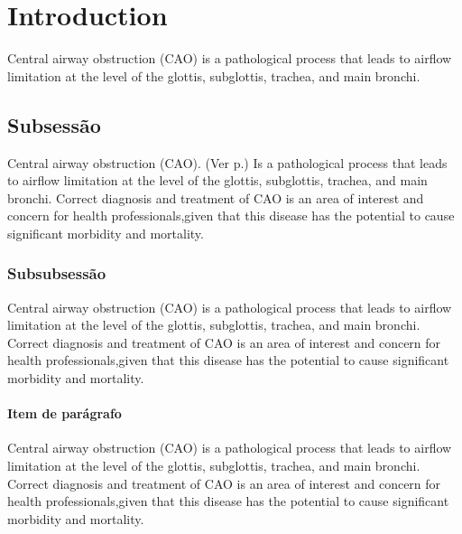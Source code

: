 \documentclass[10pt,a4paper]{article}
\begin{document}
\printtitle 
\printauthor


      \renewcommand{\sectype}[1]{}  %

   
      \section{Introduction}  %
      \label{Introduction}    %
      \sectype{sec-type}      %
      
	  Central airway obstruction (CAO) is a pathological process that leads to 
      airflow limitation at the level of the glottis, subglottis, trachea, and main bronchi. 
      

      \subsection{Subsessão}  %
      \label{Subsessão}

      Central airway obstruction (CAO). (Ver p.\pageref{Subitem de parágrafo}) Is a pathological process that leads to 
      airflow limitation at the level of the glottis, subglottis, trachea, and main bronchi. 
      Correct diagnosis and treatment of CAO is an area of interest and concern for health 
      professionals,given that this disease has the potential to cause significant morbidity and mortality.
      
      \subsubsection{Subsubsessão}  %
      \label{Subsubsessão}

      Central airway obstruction (CAO) is a pathological process that leads to 
      airflow limitation at the level of the glottis, subglottis, trachea, and main bronchi. 
      Correct diagnosis and treatment of CAO is an area of interest and concern for health 
      professionals,given that this disease has the potential to cause significant morbidity and mortality.

      \paragraph{Item de parágrafo}  %
      \label{Item de parágrafo}

      Central airway obstruction (CAO) is a pathological process that leads to 
      airflow limitation at the level of the glottis, subglottis, trachea, and main bronchi. 
      Correct diagnosis and treatment of CAO is an area of interest and concern for health 
      professionals,given that this disease has the potential to cause significant morbidity and mortality.
\end{document}
